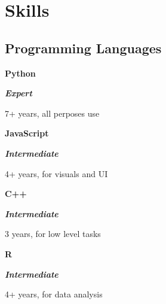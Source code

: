 \section{Skills}

\begin{multicols}{2}
\newcommand{\skill}[3]{
\parbox{0.02 \linewidth}{\hfill}
\parbox{0.19 \linewidth}{\textbf{#1}}
\parbox{0.24\linewidth}{\textit{#2}}
\parbox[t]{0.54\linewidth}{#3}
}



\newcommand{\skillplus}[4]{
\parbox{0.02 \linewidth}{\hfill}
\parbox{0.19 \linewidth}{\textbf{#1}}
\parbox{0.24\linewidth}{#2}
\parbox[t]{0.54\linewidth}{#3}
\\
\parbox[t]{0.05\linewidth}{\hfill}\parbox[t]{0.95\linewidth}{#4}
}


\subsection{Programming Languages}

\newcommand{\expert}{\textbf{\color{expert} Expert} }

\newcommand{\advanced}{\textbf{\color{advanced} Advanced} }

\newcommand{\intermediate}{\textbf{\color{intermediate} Intermediate} }

\newcommand{\proficient}{\textbf{\color{proficient} Proficient} }

\skill{Python}{\expert{}}{7+ years, all perposes use}%


\skill{JavaScript}{\intermediate{}}{4+ years, for visuals and UI}%

\skill{C++}{\intermediate{}}{3 years, for low level tasks}%

\skill{R}{\intermediate{}}{4+ years, for data analysis}


\end{multicols}
